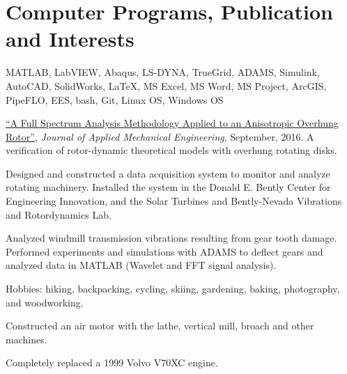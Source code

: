 \documentclass[10pt]{article} %
\begin{document}
\section{Computer Programs, Publication and Interests}
\begin{adjustwidth}{-7pt}{7pt}


	 \footnotesize{MATLAB, LabVIEW, Abaqus, LS-DYNA, TrueGrid, ADAMS, Simulink, AutoCAD, SolidWorks, {\fb \LaTeX}\setmainfont[SmallCapsFont=Fontin SmallCaps]{Fontin-Regular}, MS Excel, MS Word, MS Project, ArcGIS, PipeFLO, EES, bash, Git, Linux OS, Windows OS}\par
	 \footnotesize{ \href{https://www.omicsgroup.org/journals/a-full-spectrum-analysis-methodology-applied-to-an-anisotropic-overhung-rotor-2168-9873-1000232.php?aid=81544}{``A Full Spectrum Analysis Methodology Applied to an Anisotropic Overhung Rotor''}, \textit{Journal of Applied Mechanical Engineering}, September, 2016. A verification of rotor-dynamic theoretical models with overhung rotating disks.}\par
	 \footnotesize{Designed and constructed a data acquisition system to monitor and analyze rotating machinery. Installed the system in the Donald E. Bently Center for Engineering Innovation, and the Solar Turbines and Bently-Nevada Vibrations and Rotordynamics Lab.}\par
	 \footnotesize{Analyzed windmill transmission vibrations resulting from gear tooth damage. Performed experiments and simulations with ADAMS to deflect gears and analyzed data in MATLAB (Wavelet and FFT signal analysis).}\par
	 \footnotesize{Hobbies: hiking, backpacking, cycling, skiing, gardening, baking, photography, and woodworking.}\par
	 \footnotesize{Constructed an air motor with the lathe, vertical mill, broach and other machines.}\par
	 \footnotesize{Completely replaced a 1999 Volvo V70XC engine.}\par



\end{adjustwidth}
\end{document}
